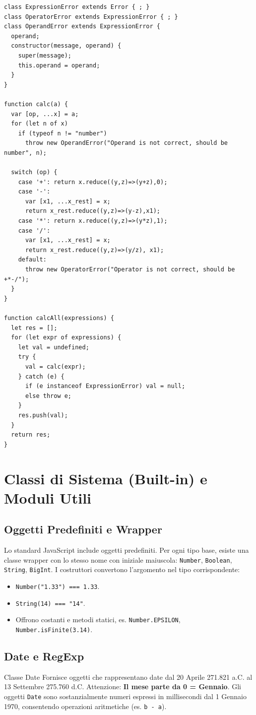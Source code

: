 \documentclass[12pt,a4paper]{article}
\begin{document}
\begin{lstlisting}
class ExpressionError extends Error { ; }
class OperatorError extends ExpressionError { ; }
class OperandError extends ExpressionError {
  operand;
  constructor(message, operand) {
    super(message);
    this.operand = operand;
  }
}

function calc(a) {
  var [op, ...x] = a;
  for (let n of x)
    if (typeof n != "number")
      throw new OperandError("Operand is not correct, should be number", n);

  switch (op) {
    case '+': return x.reduce((y,z)=>(y+z),0);
    case '-': 
      var [x1, ...x_rest] = x;
      return x_rest.reduce((y,z)=>(y-z),x1);
    case '*': return x.reduce((y,z)=>(y*z),1);
    case '/': 
      var [x1, ...x_rest] = x;
      return x_rest.reduce((y,z)=>(y/z), x1);
    default:
      throw new OperatorError("Operator is not correct, should be +*-/");
  }
}

function calcAll(expressions) {
  let res = [];
  for (let expr of expressions) {
    let val = undefined;
    try {
      val = calc(expr);
    } catch (e) {
      if (e instanceof ExpressionError) val = null;
      else throw e;
    }
    res.push(val);
  }
  return res;
}
\end{lstlisting}

\section{Classi di Sistema (Built-in) e Moduli Utili}

\subsection{Oggetti Predefiniti e Wrapper}
Lo standard JavaScript include oggetti predefiniti. Per ogni tipo base, esiste una classe wrapper con lo stesso nome con iniziale maiuscola: \texttt{Number}, \texttt{Boolean}, \texttt{String}, \texttt{BigInt}. I costruttori convertono l'argomento nel tipo corrispondente:
\begin{itemize}
    \item \texttt{Number("1.33") === 1.33}.
    \item \texttt{String(14) === "14"}.
    \item Offrono costanti e metodi statici, es. \texttt{Number.EPSILON}, \texttt{Number.isFinite(3.14)}.
\end{itemize}

\subsection{Date e RegExp}
\begin{concept}{Classe Date}
Fornisce oggetti che rappresentano date dal 20 Aprile 271.821 a.C. al 13 Settembre 275.760 d.C. 
Attenzione: \textbf{Il mese parte da 0 = Gennaio}.
Gli oggetti \texttt{Date} sono sostanzialmente numeri espressi in millisecondi dal 1 Gennaio 1970, consentendo operazioni aritmetiche (es. \texttt{b - a}).
\end{concept}
\end{document}
